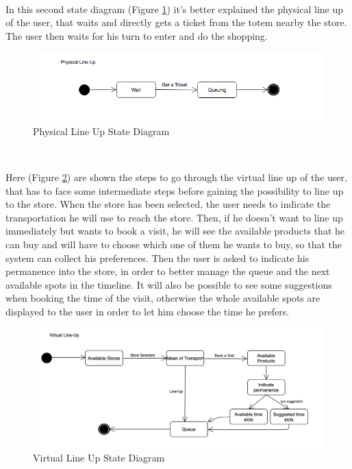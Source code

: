 \documentclass[]{article}
\begin{document}
		
		

		\textbf{}\\ \newpage
		
		In this second state diagram (Figure \ref{fig:state_diagram2}) it’s better explained the physical line up of the user, that waits and directly gets a ticket from the totem nearby the store. The user then waits for his turn to enter and do the shopping.\\

		\begin{figure}[H]
			\centering
			\includegraphics[width=\linewidth]{PhysicalLineUp_statediagram.png}
			\caption{Physical Line Up State Diagram}
			\label{fig:state_diagram2}
		\end{figure}
		
		
		
		
		\textbf{}\\ \newline
		
		Here (Figure \ref{fig:state_diagram3})  are shown the steps to go through the virtual line up of the user, that has to face some intermediate steps before gaining the possibility to line up to the store. When the store has been selected, the user needs to indicate the transportation he will use to reach the store. Then, if he doesn't want to line up immediately but wants to book a visit, he will see the available products that he can buy and will have to choose which one of them he wants to buy, so that the system can collect his preferences. Then the user is asked to indicate his permanence into the store, in order to better manage the queue and the next available spots in the timeline. It will also be possible to see some suggestions when booking the time of the visit, otherwise the whole available spots are displayed to the user in order to let him choose the time he prefers.
		\medskip
		\begin{figure}[H]
			\centering
			\includegraphics[width=\linewidth]{VirtualLineUp_statediagram.png}
			\caption{Virtual Line Up State Diagram}
			\label{fig:state_diagram3}
		\end{figure}
		
\end{document}
